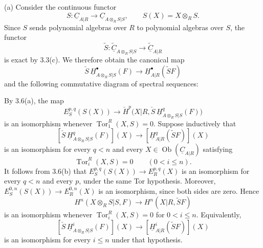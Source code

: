 (a) Consider the continuous functor
\[
 S:\underline C_{A|R}\longrightarrow
 \underline C_{A\otimes_RS|S},
 \qquad S(X)=X\otimes_RS.
\]
Since $S$ sends polynomial algebras over $R$ to polynomial
algebras over $S$, the functor
\[
 \widetilde S:\widetilde{\underline C}_{A\otimes_RS|S}
 \longrightarrow\widetilde{\underline C}_{A|R}
\]
is exact by 3.3(c). We therefore obtain the canonical map
\[
 \check S\,\underline H^{\bullet}_{A\otimes_RS|S}(F)
 \longrightarrow
 \underline H^{\bullet}_{A|R}(\widetilde SF)
\]
and the following commutative diagram of spectral sequences:
\begin{center}
\small
{}
\end{center}


By 3.6(a), the map
\[
 E_S^{p,q}(S(X))\longrightarrow
 \check H^p\bigl(X|R,
 \check S\,\underline H^q_{A\otimes_RS|S}(F)\bigr)
\]
is an isomorphism whenever
$\operatorname{Tor}_1^R(X,S)=0$. Suppose inductively that
\[
 [\check S\,\underline H^q_{A\otimes_RS|S}(F)](X)
 \longrightarrow
 [\underline H^q_{A|R}(\widetilde SF)](X)
\]
is an isomorphism for every $q<n$ and every
$X\in\operatorname{Ob}(\underline C_{A|R})$ satisfying
\[
 \operatorname{Tor}_i^R(X,S)=0\qquad(0<i\leq n).
\]
It follows from 3.6(b) that
$E_S^{p,q}(S(X))\longrightarrow E_R^{p,q}(X)$ is an isomorphism
for every $q<n$ and every $p$, under the same Tor hypothesis.
Moreover,
$E_S^{0,n}(S(X))\longrightarrow E_R^{0,n}(X)$ is an isomorphism,
since both sides are zero. Hence
\[
 H^n(X\otimes_RS|S,F)
 \longrightarrow H^n(X|R,\widetilde SF)
\]
is an isomorphism whenever
$\operatorname{Tor}_i^R(X,S)=0$ for $0<i\leq n$. Equivalently,
\[
 [\check S\,\underline H^i_{A\otimes_RS|S}(F)](X)
 \longrightarrow
 [\underline H^i_{A|R}(\widetilde SF)](X)
\]
is an isomorphism for every $i\leq n$ under that hypothesis.

